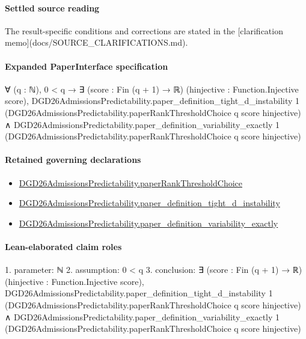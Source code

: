 \documentclass[10pt]{article}
\begin{document}
\paragraph{Settled source reading}
The result-\allowbreak{}specific conditions and corrections are stated in the [clarification memo](docs/\allowbreak{}SOURCE\_\allowbreak{}CLARIFICATIONS.\allowbreak{}md).\allowbreak{}

\paragraph{Expanded PaperInterface specification}
\begin{ReviewVerbatim}
∀ (q : ℕ),
  0 < q →
    ∃ (score : Fin (q + 1) → ℝ) (hinjective : Function.Injective score),
      DGD26AdmissionsPredictability.paper_definition_tight_d_instability 1
          (DGD26AdmissionsPredictability.paperRankThresholdChoice q score hinjective) ∧
        DGD26AdmissionsPredictability.paper_definition_variability_exactly 1
          (DGD26AdmissionsPredictability.paperRankThresholdChoice q score hinjective)
\end{ReviewVerbatim}

\paragraph{Retained governing declarations}
\begin{itemize}\raggedright
\item \hyperlink{governing-declaration-71c0faf37dfeb1af}{DGD26\allowbreak{}Admissions\allowbreak{}Predictability.\allowbreak{}paper\allowbreak{}Rank\allowbreak{}Threshold\allowbreak{}Choice}
\item \hyperlink{governing-declaration-f5c221f0a3041f33}{DGD26\allowbreak{}Admissions\allowbreak{}Predictability.\allowbreak{}paper\_\allowbreak{}definition\_\allowbreak{}tight\_\allowbreak{}d\_\allowbreak{}instability}
\item \hyperlink{governing-declaration-ce6697be3f1c2256}{DGD26\allowbreak{}Admissions\allowbreak{}Predictability.\allowbreak{}paper\_\allowbreak{}definition\_\allowbreak{}variability\_\allowbreak{}exactly}
\end{itemize}
\paragraph{Lean-elaborated claim roles}\begin{ReviewVerbatim}
1. parameter: ℕ
2. assumption: 0 < q
3. conclusion: ∃ (score : Fin (q + 1) → ℝ) (hinjective : Function.Injective score),
  DGD26AdmissionsPredictability.paper_definition_tight_d_instability 1
      (DGD26AdmissionsPredictability.paperRankThresholdChoice q score hinjective) ∧
    DGD26AdmissionsPredictability.paper_definition_variability_exactly 1
      (DGD26AdmissionsPredictability.paperRankThresholdChoice q score hinjective)
\end{ReviewVerbatim}
\end{document}
